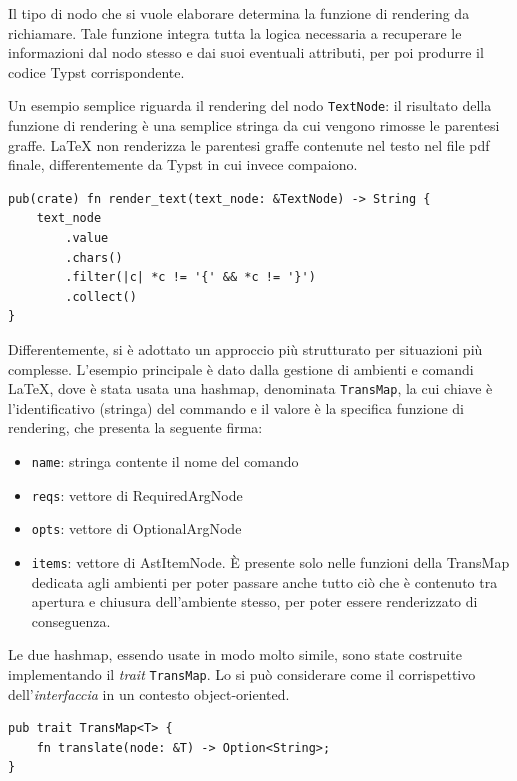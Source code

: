 \documentclass{article}
\begin{document}
    Il tipo di nodo che si vuole elaborare determina la funzione di rendering da richiamare. Tale funzione integra tutta la logica necessaria a recuperare le informazioni dal nodo stesso e dai suoi eventuali attributi, per poi produrre il codice Typst corrispondente.

    Un esempio semplice riguarda il rendering del nodo \texttt{TextNode}: il risultato della funzione di rendering è una semplice stringa da cui vengono rimosse le parentesi graffe. LaTeX non renderizza le parentesi graffe contenute nel testo nel file pdf finale, differentemente da Typst in cui invece compaiono.

    \begin{verbatim}
pub(crate) fn render_text(text_node: &TextNode) -> String {
    text_node
        .value
        .chars()
        .filter(|c| *c != '{' && *c != '}')
        .collect()
}
    \end{verbatim}

    Differentemente, si è adottato un approccio più strutturato per situazioni più complesse.
    L'esempio principale è dato dalla gestione di ambienti e comandi LaTeX, dove è stata usata una hashmap, denominata \texttt{TransMap}, la cui chiave è l'identificativo (stringa) del commando e il valore è la specifica funzione di rendering, che presenta la seguente firma:

    \begin{itemize}
        \item \texttt{name}: stringa contente il nome del comando
        \item \texttt{reqs}: vettore di RequiredArgNode
        \item \texttt{opts}: vettore di OptionalArgNode
        \item \texttt{items}: vettore di AstItemNode. È presente solo nelle funzioni della TransMap dedicata agli ambienti per poter passare anche tutto ciò che è contenuto tra apertura e chiusura dell'ambiente stesso, per poter essere renderizzato di conseguenza.
    \end{itemize}

    Le due hashmap, essendo usate in modo molto simile, sono state costruite implementando il \textit{trait} \texttt{TransMap}. Lo si può considerare come il corrispettivo dell'\textit{interfaccia} in un contesto object-oriented.

    \begin{verbatim}
pub trait TransMap<T> {
    fn translate(node: &T) -> Option<String>;
}
    \end{verbatim}
\end{document}
